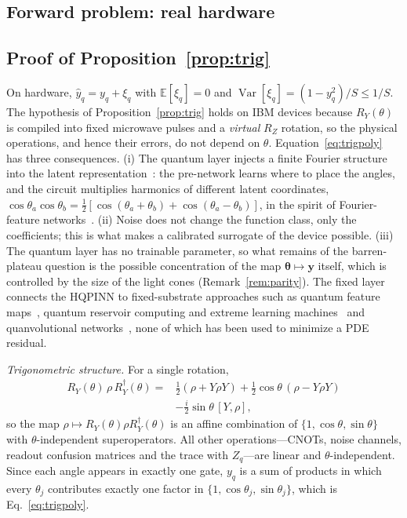 \documentclass[floatfix,aps,pra,twocolumn,superscriptaddress,10pt,nofootinbib]{revtex4-2}
\begin{document}
\begin{appendices}
\section{Forward problem: real hardware}\label{app:fqpu}

\subsection{Proof of Proposition~\ref{prop:trig}}\label{app:trig}
On hardware, $\hat y_q=y_q+\xi_q$ with $\mathbb E[\xi_q]=0$ and $\operatorname{Var}[\xi_q]=(1-y_q^2)/S\le1/S$. The hypothesis of Proposition~\ref{prop:trig} holds on IBM devices because $R_Y(\theta)$ is compiled into fixed microwave pulses and a \emph{virtual} $R_Z$ rotation, so the physical operations, and hence their errors, do not depend on $\theta$. Equation~\eqref{eq:trigpoly} has three consequences. (i) The quantum layer injects a finite Fourier structure into the latent representation~\cite{schuld2021effect}: the pre-network learns where to place the angles, and the circuit multiplies harmonics of different latent coordinates, $\cos\theta_a\cos\theta_b=\tfrac12[\cos(\theta_a+\theta_b)+\cos(\theta_a-\theta_b)]$, in the spirit of Fourier-feature networks~\cite{tancik2020fourier,rahimi2007random}. (ii) Noise does not change the function class, only the coefficients; this is what makes a calibrated surrogate of the device possible. (iii) The quantum layer has no trainable parameter, so what remains of the barren-plateau question is the possible concentration of the map $\bm\theta\mapsto\bm y$ itself, which is controlled by the size of the light cones (Remark~\ref{rem:parity}). The fixed layer connects the HQPINN to fixed-substrate approaches such as quantum feature maps~\cite{havlicek2019supervised}, quantum reservoir computing and extreme learning machines~\cite{fujii2017harnessing,mujal2021opportunities} and quanvolutional networks~\cite{henderson2020quanvolutional}, none of which has been used to minimize a PDE residual.

\emph{Trigonometric structure.} For a single rotation,
\begin{align}
  R_Y(\theta)\,\rho\,R_Y^\dagger(\theta)={}&\tfrac12(\rho+Y\rho Y)+\tfrac12\cos\theta\,(\rho-Y\rho Y)\nonumber\\
  &-\tfrac{i}{2}\sin\theta\,[Y,\rho],
  \label{eq:ry_channel}
\end{align}
so the map $\rho\mapsto R_Y(\theta)\rho R_Y^\dagger(\theta)$ is an affine combination of $\{1,\cos\theta,\sin\theta\}$ with $\theta$-independent superoperators. All other operations---CNOTs, noise channels, readout confusion matrices and the trace with $Z_q$---are linear and $\theta$-independent. Since each angle appears in exactly one gate, $y_q$ is a sum of products in which every $\theta_j$ contributes exactly one factor in $\{1,\cos\theta_j,\sin\theta_j\}$, which is Eq.~\eqref{eq:trigpoly}.


\end{appendices}
\end{document}
